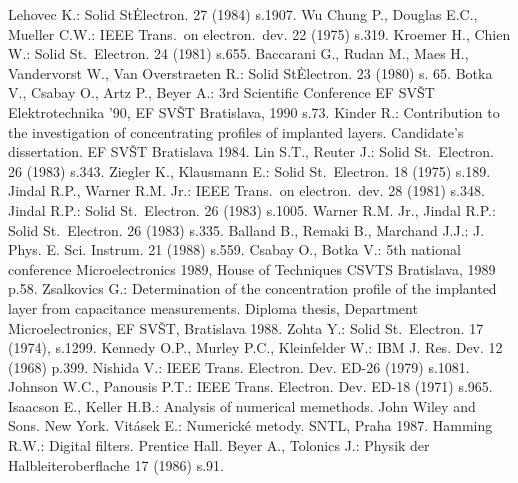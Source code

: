 \begin{thebibliography}{}
 Lehovec K.: Solid St\.  Electron.  27 (1984)
  s.1907.
 Wu Chung P., Douglas E.C., Mueller C.W.: IEEE
  Trans.\ on electron.\ dev. 22 (1975) s.319.
 Kroemer H., Chien W.: Solid St.\ Electron. 24
  (1981) s.655.
 Baccarani G., Rudan M., Maes H., Vandervorst W.,
  Van Overstraeten R.: Solid St\. Electron. 23 (1980) s. 65.
 Botka V., Csabay O., Artz P., Beyer A.: 3rd
  Scientific Conference EF SVŠT Elektrotechnika '90, EF SVŠT
  Bratislava, 1990 s.73.
 Kinder R.: Contribution to the investigation of
  concentrating profiles of implanted layers. Candidate's
  dissertation. EF SVŠT Bratislava 1984.
 Lin S.T., Reuter J.: Solid St.\ Electron. 26 (1983)
  s.343.
 Ziegler K., Klausmann E.: Solid St.\ Electron. 18
  (1975) s.189.
 Jindal R.P., Warner R.M. Jr.: IEEE Trans.\ on
  electron.\ dev. 28 (1981) s.348.
 Jindal R.P.: Solid St.\ Electron. 26 (1983)
  s.1005.
 Warner R.M. Jr., Jindal R.P.: Solid
  St.\ Electron. 26 (1983) s.335.
 Balland B., Remaki B., Marchand J.J.:
  J. Phys. E. Sci. Instrum. 21 (1988) s.559.
 Csabay O., Botka V.: 5th national conference
  Microelectronics 1989, House of Techniques CSVTS Bratislava, 1989
  p.58.
 Zsalkovics G.: Determination of the concentration
  profile of the implanted layer from capacitance
  measurements. Diploma thesis, Department Microelectronics, EF SVŠT,
  Bratislava 1988.
 Zohta Y.: Solid St.\ Electron. 17 (1974), s.1299.
 Kennedy O.P., Murley P.C., Kleinfelder W.: IBM
  J. Res. Dev. 12 (1968) p.399.
 Nishida V.: IEEE Trans. Electron. Dev. ED-26
  (1979) s.1081.
 Johnson W.C., Panousis P.T.: IEEE
  Trans. Electron. Dev. ED-18 (1971) s.965.
 Isaacson E., Keller H.B.: Analysis of numerical
  memethods.  John Wiley and Sons. New York.
 Vitásek E.: Numerické metody. SNTL, Praha 1987.
 Hamming R.W.: Digital filters. Prentice Hall.
 Beyer A., Tolonics J.: Physik der
  Halbleiteroberflache 17 (1986) s.91.
\end{thebibliography}
